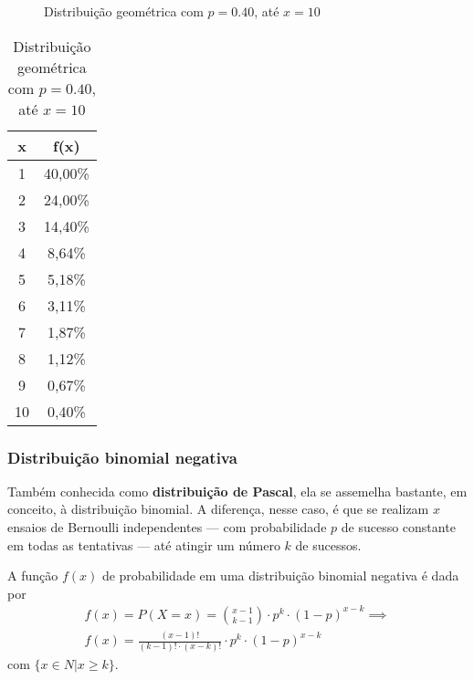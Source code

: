 \begin{figure}[htpb]
    \centering
    \resizebox{\textwidth}{!}{}
    \caption{Distribuição geométrica com $p=0.40$, até $x=10$}
    \label{fig:exemplo_arremesso_basquete}
\end{figure}

\begin{table}[htpb]
    \centering
    \begin{tabular}{cc}
    \toprule
    x & f(x) \\
    \midrule
    1 & 40,00\% \\
    2 & 24,00\% \\
    3 & 14,40\% \\
    4 & 8,64\% \\
    5 & 5,18\% \\
    6 & 3,11\% \\
    7 & 1,87\% \\
    8 & 1,12\% \\
    9 & 0,67\% \\
    10 & 0,40\% \\
    \bottomrule
    \end{tabular}
    \caption{Distribuição geométrica com $p=0.40$, até $x=10$}
    \label{tab:exemplo_arremesso_basquete}
\end{table}

\subsubsection{Distribuição binomial negativa}

Também conhecida como \textbf{distribuição de Pascal}, ela se assemelha
bastante, em conceito, à distribuição binomial. A diferença, nesse caso, é que
se realizam $x$ ensaios de Bernoulli independentes --- com probabilidade $p$ de
sucesso constante em todas as tentativas --- até atingir um número $k$ de
sucessos.

A função $f(x)$ de probabilidade em uma distribuição binomial negativa é dada
por
\begin{equation}
    \begin{split}
    f(x) = P(X=x) = \binom{x-1}{k-1} \cdot p^{k} \cdot (1-p)^{x-k} \implies \\
    f(x) = \frac{(x-1)!}{(k-1)! \cdot (x-k)!} \cdot p^{k} \cdot (1-p)^{x-k}
    \end{split}
    \label{eq:dist-binom-negativa}
\end{equation}
com $\{ x \in N | x \geq k \}$.

